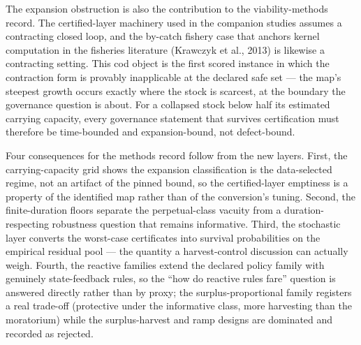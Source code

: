 \documentclass[11pt]{article}
\begin{document}
The expansion obstruction is also the contribution to the
viability-methods record. The certified-layer machinery used in the
companion studies assumes a contracting closed loop, and the by-catch
fishery case that anchors kernel computation in the fisheries literature
(Krawczyk et al., 2013) is likewise a contracting setting. This cod
object is the first scored instance in which the contraction form is
provably inapplicable at the declared safe set --- the map's steepest
growth occurs exactly where the stock is scarcest, at the boundary the
governance question is about. For a collapsed stock below half its
estimated carrying capacity, every governance statement that survives
certification must therefore be time-bounded and expansion-bound, not
defect-bound.

Four consequences for the methods record follow from the new layers.
First, the carrying-capacity grid shows the expansion classification is
the data-selected regime, not an artifact of the pinned bound, so the
certified-layer emptiness is a property of the identified map rather
than of the conversion's tuning. Second, the finite-duration floors
separate the perpetual-class vacuity from a duration-respecting
robustness question that remains informative. Third, the stochastic
layer converts the worst-case certificates into survival probabilities
on the empirical residual pool --- the quantity a harvest-control
discussion can actually weigh. Fourth, the reactive families extend the
declared policy family with genuinely state-feedback rules, so the ``how
do reactive rules fare'' question is answered directly rather than by
proxy; the surplus-proportional family registers a real trade-off
(protective under the informative class, more harvesting than the
moratorium) while the surplus-harvest and ramp designs are dominated and
recorded as rejected.
\end{document}
